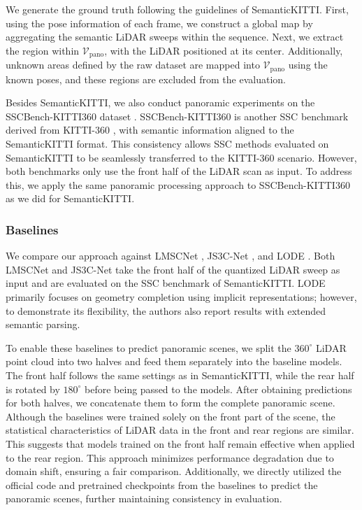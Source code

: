 \documentclass[conference]{IEEEtran}
\begin{document}
We generate the ground truth following the guidelines of SemanticKITTI.
First, using the pose information of each frame, we construct a global map by aggregating the semantic LiDAR sweeps within the sequence.
Next, we extract the region within $\mathcal{V}_\mathrm{pano}$, with the LiDAR positioned at its center.
Additionally, unknown areas defined by the raw dataset are mapped into $\mathcal{V}_\mathrm{pano}$ using the known poses, and these regions are excluded from the evaluation.

Besides SemanticKITTI, we also conduct panoramic experiments on the SSCBench-KITTI360 dataset \cite{yli2020}.
SSCBench-KITTI360 is another SSC benchmark derived from KITTI-360 \cite{yliao}, with semantic information aligned to the SemanticKITTI format.
This consistency allows SSC methods evaluated on SemanticKITTI to be seamlessly transferred to the KITTI-360 scenario.
However, both benchmarks only use the front half of the LiDAR scan as input.
To address this, we apply the same panoramic processing approach to SSCBench-KITTI360 as we did for SemanticKITTI.

\subsubsection{Baselines}

We compare our approach against LMSCNet \cite{lroldao2020}, JS3C-Net \cite{xyan}, and LODE \cite{pli2022}.
Both LMSCNet and JS3C-Net take the front half of the quantized LiDAR sweep as input and are evaluated on the SSC benchmark of SemanticKITTI.
LODE primarily focuses on geometry completion using implicit representations; however, to demonstrate its flexibility, the authors also report results with extended semantic parsing.

To enable these baselines to predict panoramic scenes, we split the $360^\circ$ LiDAR point cloud into two halves and feed them separately into the baseline models.
The front half follows the same settings as in SemanticKITTI, while the rear half is rotated by $180^\circ$ before being passed to the models.
After obtaining predictions for both halves, we concatenate them to form the complete panoramic scene.
Although the baselines were trained solely on the front part of the scene, the statistical characteristics of LiDAR data in the front and rear regions are similar.
This suggests that models trained on the front half remain effective when applied to the rear region.
This approach minimizes performance degradation due to domain shift, ensuring a fair comparison.
Additionally, we directly utilized the official code and pretrained checkpoints from the baselines to predict the panoramic scenes, further maintaining consistency in evaluation.
\end{document}
